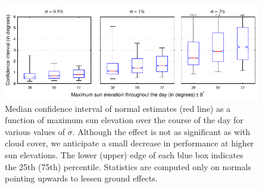 \begin{figure}[t]
    \centering
    \includegraphics[width=\linewidth]{./figures/confidenceIntervals/sunElevationPlot-topHemisphere.pdf}
    \caption[Confidence interval in function of sun elevation]{Median confidence interval of normal estimates (red line) as a function of maximum sun elevation over the course of the day for various values of $\sigma$. Although the effect is not as significant as with cloud cover, we anticipate a small decrease in performance at higher sun elevations. The lower (upper) edge of each blue box indicates the 25th (75th) percentile. Statistics are computed only on normals pointing upwards to lessen ground effects.}
    \label{fig:sun-elevation-plot}
\end{figure}


